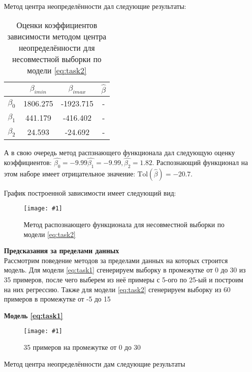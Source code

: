 \documentclass[a4paper,12pt]{article}
\newcommand{\plot}[3]{
    \begin{figure}[H]
        \texttt{[image: \#1]}
        \caption{#2}
        \label{#3}
    \end{figure}
}
\begin{document}
    \noindent Метод центра неопределённости дал следующие результаты:
    \begin{table}[H]
        \begin{center}
            \begin{tabular}{| c | c | c | c |}
                \hline
                & $ \beta_{imin} $ & $ \beta_{imax} $ & $ \hat{\beta} $ \\
                \hline
                $ \beta_{0} $ & 1806.275 & -1923.715 & - \\
                \hline
                $ \beta_{1} $ & 441.179 & -416.402 & - \\
                \hline
                $ \beta_{2} $ & 24.593 & -24.692 & - \\
                \hline
            \end{tabular}
        \end{center}
        \caption{Оценки коэффициентов зависимости методом центра неопределённости для несовместной выборки по модели \ref{eq:task2}}
        \label{t:estimdata50}
    \end{table}

    \noindent А в свою очередь метод распзнающего функционала дал следующую оценку коэффициентов:
    $ \hat{\beta_0} = -9.99 \hat{\beta_{1}} = -9.99, \hat{\beta_{2}} = 1.82 $.
    Распознающий функционал на этом наборе имеет отрицательное значение: $ \text{Tol}(\hat{\beta}) = -20.7 $.

    \noindent График построенной зависимости имеет следующий вид:
    \plot{TolDataWithEstims50}{Метод распознающего функционала для несовместной выборки по модели \ref{eq:task2}}{p:tolestimdata50}
    
    \newpage
    \noindent\textbf{Предсказания за пределами данных} \\
     Рассмотрим поведение методов за пределами данных на которых строится модель.
    Для модели \ref{eq:task1} сгенерируем выборку в промежутке от 0 до 30 из 35 примеров, после чего выберем из неё примеры с 5-ого по 25-ый и построим на них регрессию.
    Также для модели \ref{eq:task2} сгенерируем выборку из 60 примеров в промежутке от -5 до 15
    
    \noindent\textbf{Модель \ref{eq:task1}}
    
    \plot{None35}{35 примеров на промежутке от 0 до 30}{p:tolestimdata50}
    
    \newpage
    
    Метод центра неопределённости дам следующие результаты
    
\end{document}
